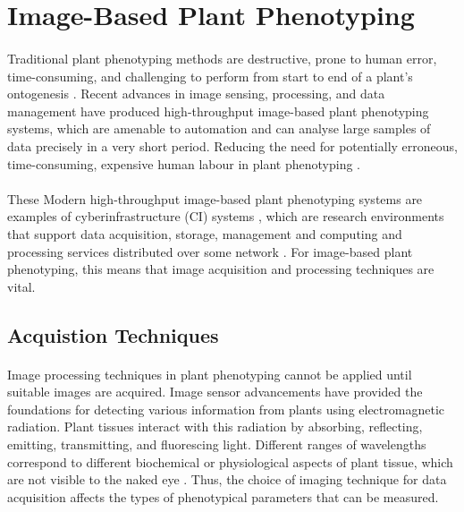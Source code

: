 \section{Image-Based Plant Phenotyping}

 \paragraph{}
 Traditional plant phenotyping methods are destructive, prone to human error, time-consuming, and challenging to perform from start to end of a plant's ontogenesis \cite{arnalbarbedoDigitalImageProcessing2013, zhangHighthroughputPhenotypingPlant2023, laxmanNoninvasiveQuantificationTomato2018}. Recent advances in image sensing, processing, and data management have produced high-throughput image-based plant phenotyping systems, which are amenable to automation and can analyse large samples of data precisely in a very short period. Reducing the need for potentially erroneous, time-consuming, expensive human labour in plant phenotyping \cite{daschoudhuryLeveragingImageAnalysis2019}. 
 
 \paragraph{}
 These Modern high-throughput image-based plant phenotyping systems are examples of cyberinfrastructure (CI) systems \cite{abebeImageBasedHighThroughputPhenotyping2023}, which are research environments that support data acquisition, storage, management and computing and processing services distributed over some network \cite{nabwireReviewApplicationArtificial2021}. For image-based plant phenotyping, this means that image acquisition and processing techniques are vital.
 
 \subsection{Acquistion Techniques}
 
\paragraph{}
Image processing techniques in plant phenotyping cannot be applied until suitable images are acquired. Image sensor advancements have provided the foundations for detecting various information from plants using electromagnetic radiation. Plant tissues interact with this radiation by absorbing, reflecting, emitting, transmitting, and fluorescing light. Different ranges of wavelengths correspond to different biochemical or physiological aspects of plant tissue, which are not visible to the naked eye \cite{liReviewImagingTechniques2014}. Thus, the choice of imaging technique for data acquisition affects the types of phenotypical parameters that can be measured. 

